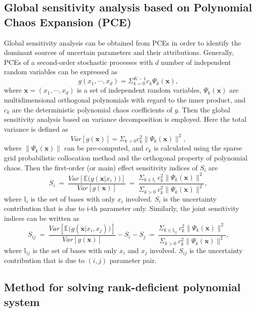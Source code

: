 \subsection*{Global sensitivity analysis based on Polynomial Chaos Expansion (PCE)}
Global sensitivity analysis can be obtained from PCEs in order to
identify the dominant sources of uncertain parameters and their
attributions. Generally, PCEs of a second-order stochastic processes
with $d$ number of independent random variables can be expressed as
\[g(x_1, \cdots, x_d ) = \Sigma_{k=0}^{K-1} c_k \Psi_k
(\mathbf{x}),\]where $\mathbf{x} = (x_1, \cdots,x_d)$ is a set of
independent random variables, $\Psi_k (\mathbf{x})$ are
multidimensional orthogonal polynomials with regard to the inner
product, and $c_k$ are the deterministic polynomial chaos
coefficients of $g$. Then the global sensitivity analysis based on
variance decomposition is employed. Here the total variance is
defined as \[Var[g(\mathbf{x})] = \Sigma_{k>0} c_k^2 \|\Psi_k
(\mathbf{x})\|^2, \] where $\|\Psi_k(\mathbf{x})\|$ can be
pre-computed, and $c_k$ is calculated using the sparse grid
probabilistic collocation method and the orthogonal property of
polynomial chaos. Then the first-order (or main) effect sensitivity
indices of $S_i$ are
\[S_i ~=~
\frac{Var[\mathbb{E}\big(g(\mathbf{x}|x_i)\big)]}{
Var[g(\mathbf{x})]}~=~\frac{\Sigma_{k\in\mathbb{I}_i}~ c_k^2
\|\Psi_k (\mathbf{x})\|^2}{\Sigma_{k>0} ~c_k^2 \|\Psi_k
(\mathbf{x})\|^2},\] where $\mathbb{I}_i$ is the set of bases with
only $x_i$ involved. $S_i$ is the uncertainty contribution that is
due to i-th parameter only. Similarly, the joint sensitivity indices can
be written as
\[S_{ij} ~=~
\frac{Var[\mathbb{E}\big(g(\mathbf{x}|x_i,x_j)\big)]}{
Var[g(\mathbf{x})]}-S_i-S_j~=~\frac{\Sigma_{k\in\mathbb{I}_{ij}}~
c_k^2 \|\Psi_k (\mathbf{x})\|^2}{\Sigma_{k>0} ~c_k^2 \|\Psi_k
(\mathbf{x})\|^2},\] where $\mathbb{I}_{ij}$ is the set of bases
with only $x_i$ and $x_j$ involved. $S_{ij}$ is the uncertainty
contribution that is due to $(i,j)$ parameter pair.

\subsection*{Method for solving rank-deficient polynomial system}
\label{sec:steady}

